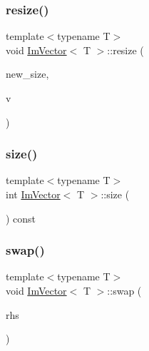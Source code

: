 \hypertarget{class_im_vector_abe7f21776ecfb7d0214963fd8c0689f0}{}\label{class_im_vector_abe7f21776ecfb7d0214963fd8c0689f0} 
\subsubsection{\texorpdfstring{resize()}{resize()}\hspace{0.1cm}{\footnotesize\ttfamily [2/2]}}
{\footnotesize\ttfamily template$<$typename T$>$ \\
void \hyperlink{class_im_vector}{Im\+Vector}$<$ T $>$\+::resize (\begin{DoxyParamCaption}\item[{int}]{new\+\_\+size,  }\item[{const T \&}]{v }\end{DoxyParamCaption})}

\hypertarget{class_im_vector_a8c903ecb1aaee0601b6a8ad835a4a435}{}\label{class_im_vector_a8c903ecb1aaee0601b6a8ad835a4a435} 
\subsubsection{\texorpdfstring{size()}{size()}}
{\footnotesize\ttfamily template$<$typename T$>$ \\
int \hyperlink{class_im_vector}{Im\+Vector}$<$ T $>$\+::size (\begin{DoxyParamCaption}{ }\end{DoxyParamCaption}) const}

\hypertarget{class_im_vector_afcec0d2a1e28aebe412b6efd06f0a77a}{}\label{class_im_vector_afcec0d2a1e28aebe412b6efd06f0a77a} 
\subsubsection{\texorpdfstring{swap()}{swap()}}
{\footnotesize\ttfamily template$<$typename T$>$ \\
void \hyperlink{class_im_vector}{Im\+Vector}$<$ T $>$\+::swap (\begin{DoxyParamCaption}\item[{\hyperlink{class_im_vector}{Im\+Vector}$<$ T $>$ \&}]{rhs }\end{DoxyParamCaption})}



